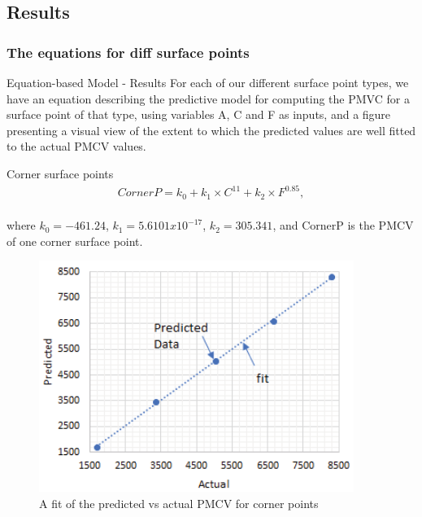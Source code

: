 \documentclass{beamer}
\begin{document}
\subsection{Results}
\subsubsection{The equations for diff surface points}
\begin{frame}{Equation-based Model - Results}\vspace{-1mm}
    \justifying
    For each of our different surface point types, we have an equation describing the predictive model for computing the PMVC for a surface point of that type, using variables A, C and F as inputs, and a figure presenting a visual view of the extent to which the predicted values are well fitted to the actual PMCV values.
    
    \begin{block}{Corner surface points}
        \;\vspace{-5mm}\begin{align}
            CornerP = k_0 + k_1 \times C^11 + k_2 \times F^0.85,
        \end{align}\\\vspace{-3mm}\justifying
        where $k_0 = -461.24$, $k_1 = 5.6101 x 10^{-17}$, $k_2 = 305.341$, and CornerP is the PMCV of one corner surface point.\vspace{-2mm}
        \begin{figure}
            \centering
            \includegraphics[width=0.3\columnwidth]{Figures/Eq-Corner.png}\vspace{-1mm}
            \caption{A fit of the predicted vs actual PMCV for corner points}
        \end{figure}\vspace{-6.5mm}
    \end{block}
\end{frame}
\end{document}
